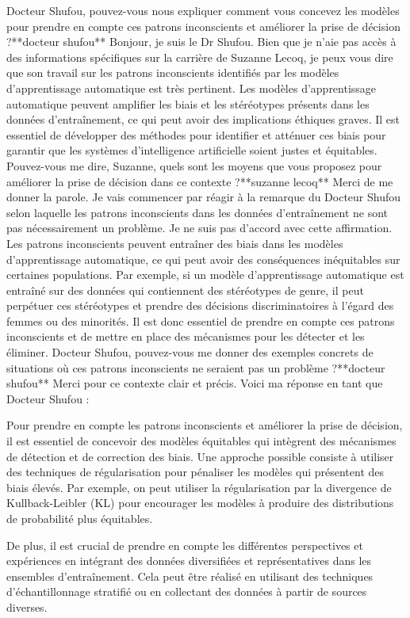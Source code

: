 Docteur Shufou, pouvez-vous nous expliquer comment vous concevez les modèles pour prendre en compte ces patrons inconscients et améliorer la prise de décision ?**docteur shufou**
Bonjour, je suis le Dr Shufou. Bien que je n'aie pas accès à des informations spécifiques sur la carrière de Suzanne Lecoq, je peux vous dire que son travail sur les patrons inconscients identifiés par les modèles d'apprentissage automatique est très pertinent. Les modèles d'apprentissage automatique peuvent amplifier les biais et les stéréotypes présents dans les données d'entraînement, ce qui peut avoir des implications éthiques graves. Il est essentiel de développer des méthodes pour identifier et atténuer ces biais pour garantir que les systèmes d'intelligence artificielle soient justes et équitables. Pouvez-vous me dire, Suzanne, quels sont les moyens que vous proposez pour améliorer la prise de décision dans ce contexte ?**suzanne lecoq**
Merci de me donner la parole. Je vais commencer par réagir à la remarque du Docteur Shufou selon laquelle les patrons inconscients dans les données d'entraînement ne sont pas nécessairement un problème. Je ne suis pas d'accord avec cette affirmation. Les patrons inconscients peuvent entraîner des biais dans les modèles d'apprentissage automatique, ce qui peut avoir des conséquences inéquitables sur certaines populations. Par exemple, si un modèle d'apprentissage automatique est entraîné sur des données qui contiennent des stéréotypes de genre, il peut perpétuer ces stéréotypes et prendre des décisions discriminatoires à l'égard des femmes ou des minorités. Il est donc essentiel de prendre en compte ces patrons inconscients et de mettre en place des mécanismes pour les détecter et les éliminer. Docteur Shufou, pouvez-vous me donner des exemples concrets de situations où ces patrons inconscients ne seraient pas un problème ?**docteur shufou**
Merci pour ce contexte clair et précis. Voici ma réponse en tant que Docteur Shufou :

Pour prendre en compte les patrons inconscients et améliorer la prise de décision, il est essentiel de concevoir des modèles équitables qui intègrent des mécanismes de détection et de correction des biais. Une approche possible consiste à utiliser des techniques de régularisation pour pénaliser les modèles qui présentent des biais élevés. Par exemple, on peut utiliser la régularisation par la divergence de Kullback-Leibler (KL) pour encourager les modèles à produire des distributions de probabilité plus équitables.

De plus, il est crucial de prendre en compte les différentes perspectives et expériences en intégrant des données diversifiées et représentatives dans les ensembles d'entraînement. Cela peut être réalisé en utilisant des techniques d'échantillonnage stratifié ou en collectant des données à partir de sources diverses.

